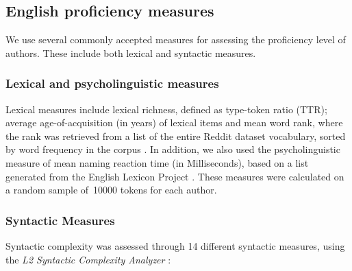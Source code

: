 \documentclass[11pt]{article}
\newcommand{\note}[1]{\textit{\small\color{magenta}{#1}}}
\begin{document}
\subsection{English proficiency measures}

We use several commonly accepted measures for assessing the proficiency level of authors. These include both lexical and syntactic measures.

\subsubsection{Lexical and psycholinguistic measures}

Lexical measures include lexical richness, defined as type-token ratio (TTR); average age-of-acquisition (in years) of lexical items \citep{Kuperman2012} and mean word rank, where the rank was retrieved from a list of the entire Reddit dataset vocabulary, sorted by word frequency in the corpus \citep{TACL1403}.  In addition, we also used the psycholinguistic measure of mean naming reaction time (in Milliseconds), based on a list generated from the English Lexicon Project \citep{Balota2007}. These measures were calculated on a random sample of~10000 tokens for each author.


\subsubsection{Syntactic Measures }

Syntactic complexity was assessed through 14 different syntactic measures, using the \emph{L2 Syntactic Complexity Analyzer} \citep{Lu2010-Automatic}: \note{leave only the ones you end up using}
\end{document}
